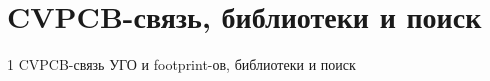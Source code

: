 \chapter{CVPCB-связь, библиотеки и поиск}\label{kicad:cvpcb}
1 CVPCB-связь УГО и footprint-ов, библиотеки и поиск
